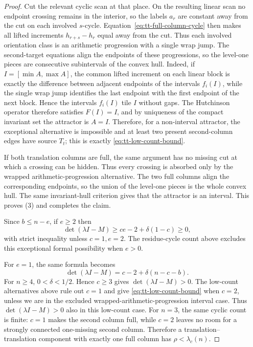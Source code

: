 \documentclass{amsart}
\theoremstyle{definition}
\theoremstyle{remark}
\begin{document}
\begin{proof}
Cut the relevant cyclic scan at that place.  On the resulting linear
scan no endpoint crossing remains in the interior, so the labels
\(a_r\) are constant away from the cut on each involved \(s\)-cycle.
Equation~\eqref{eq:tt-full-column-cycle} then makes all lifted
increments \(h_{r+s}-h_r\) equal away from the cut.  Thus each involved
orientation class is an arithmetic progression with a single wrap jump.
The second-target equations align the endpoints of these progressions,
so the level-one pieces are consecutive subintervals of the convex hull.
Indeed, if \(I=[\min A,\max A]\), the common lifted increment on each
linear block is exactly the difference between adjacent endpoints of the
intervals \(f_i(I)\), while the single wrap jump identifies the last
endpoint with the first endpoint of the next block.  Hence the intervals
\(f_i(I)\) tile \(I\) without gaps.  The Hutchinson operator therefore
satisfies \(F(I)=I\), and by uniqueness of the compact invariant set the
attractor is \(A=I\).  Therefore, for a non-interval attractor, the
exceptional alternative is impossible and at least two present
second-column edges have source \(T_t\); this is exactly
\eqref{eq:tt-low-count-bound}.

If both translation columns are full, the same argument has no missing
cut at which a crossing can be hidden.  Thus every crossing is absorbed
only by the wrapped arithmetic-progression alternative.  The two full
columns align the corresponding endpoints, so the union of the level-one
pieces is the whole convex hull.  The same invariant-hull criterion gives
that the attractor is an interval.  This proves (3) and completes the
claim.

Since \(b\le n-e\), if \(e\ge2\) then
\[
  \det(\lambda I-M)
  \ge ce-2+\delta(1-c)\ge0,
\]
with strict inequality unless \(c=1,e=2\).  The residue-cycle count
above excludes this exceptional formal possibility when \(e>0\).

For \(e=1\), the same formula becomes
\[
  \det(\lambda I-M)=c-2+\delta(n-c-b).
\]
For \(n\ge4\), \(0<\delta<1/2\).  Hence \(c\ge3\) gives
\(\det(\lambda I-M)>0\).  The low-count alternatives above rule out
\(c=1\) and give \eqref{eq:tt-low-count-bound} when \(c=2\), unless we
are in the excluded wrapped-arithmetic-progression interval case.  Thus
\(\det(\lambda I-M)>0\) also in this low-count case.  For \(n=3\), the
same cyclic count is finite: \(c=1\) makes the second column full, while
\(c=2\) leaves no room for a strongly connected one-missing second
column.  Therefore a
translation--translation component with exactly one full column has
\(\rho<\lambda_c(n)\).


\end{proof}
\end{document}
